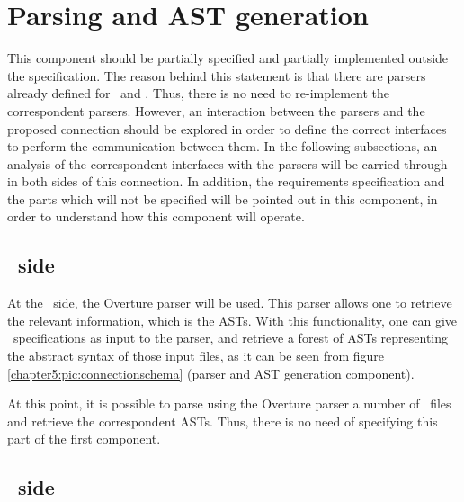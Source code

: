 \section{Parsing and AST generation}
\label{sec:component1}

This component should be partially specified and partially implemented outside the specification. The reason behind this statement is that there are parsers already defined for \vpp\ and \jml. Thus, there is no need to re-implement the correspondent parsers. However, an interaction between the parsers and the proposed connection should be explored in order to define the correct interfaces to perform the communication between them. In the following subsections, an analysis of the correspondent interfaces with the parsers will be carried through in both sides of this connection. In addition, the requirements specification and the parts which will not be specified will be pointed out in this component, in order to understand how this component will operate.

\subsection{\vpp\ side}

At the \vpp\ side, the Overture parser will be used. This parser allows one to retrieve the relevant information, which is the ASTs. With this functionality, one can give \vpp\ specifications as input to the parser, and retrieve a forest of ASTs representing the abstract syntax of those input files, as it can be seen from figure \ref{chapter5:pic:connectionschema} (parser and AST generation component).

At this point, it is possible to parse using the Overture parser a number of \vpp\ files and retrieve the correspondent ASTs. Thus, there is no need of specifying this part of the first component.

\subsection{\jml\ side}

